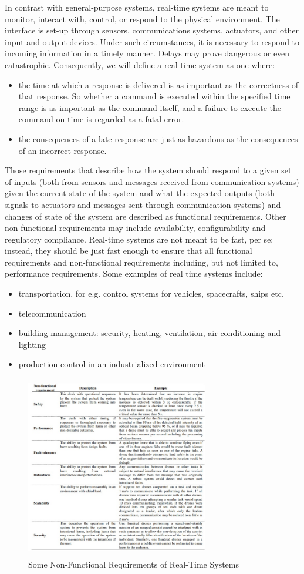 \documentclass[conference]{IEEEtran}
\begin{document}
In contrast with general-purpose systems, real-time systems are meant to monitor, interact with, control, or respond to the physical environment. The interface is set-up through sensors, communications systems, actuators, and other input and output devices. Under such circumstances, it is necessary to respond to incoming information in a timely manner. Delays may prove dangerous or even catastrophic. Consequently, we will define a real-time system as one where:
\begin{itemize}
	\item the time at which a response is delivered is as important as the correctness of that response. So whether a command is executed within the specified time range is as important as the command itself, and a failure to execute the command on time is regarded as a fatal error.
	\item the consequences of a late response are just as hazardous as the consequences of an incorrect response.
\end{itemize}
Those requirements that describe how the system should respond to a given set of inputs (both from sensors and
messages received from communication systems) given the current state of the system and what the expected outputs
(both signals to actuators and messages sent through communication systems) and changes of state of the system are
described as functional requirements.
Other non-functional requirements may include availability, configurability and regulatory compliance. Real-time
systems are not meant to be fast, per se; instead, they should be just fast enough to ensure that all functional requirements
and non-functional requirements including, but not limited to, performance requirements.
Some examples of real time systems include:
\begin{itemize}
	\item transportation, for e.g. control systems for vehicles, spacecrafts, ships etc.
	\item telecommunication
	\item building management: security, heating, ventilation, air conditioning and lighting
	\item production control in an industrialized environment
\end{itemize}
\begin{figure}[h!]
	\includegraphics[width=8cm, height=8cm]{table1}
	\caption{Some Non-Functional Requirements of Real-Time Systems}
	\centering
\end{figure}
\end{document}
